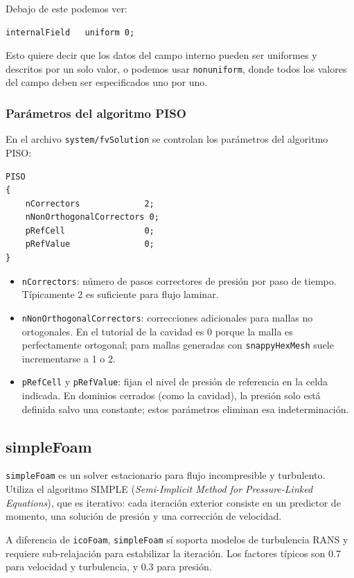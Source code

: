 Debajo de este podemos ver:
\begin{verbatim}
internalField   uniform 0;
\end{verbatim}
Esto quiere decir que los datos del campo interno pueden ser uniformes y descritos por un solo valor, o podemos usar \texttt{nonuniform}, donde todos los valores del campo deben ser especificados uno por uno.

\subsubsection*{Parámetros del algoritmo PISO}

En el archivo \texttt{system/fvSolution} se controlan los parámetros del algoritmo PISO:
\begin{verbatim}
PISO
{
    nCorrectors             2;
    nNonOrthogonalCorrectors 0;
    pRefCell                0;
    pRefValue               0;
}
\end{verbatim}
\begin{itemize}
  \item \texttt{nCorrectors}: número de pasos correctores de presión por paso de tiempo. Típicamente 2 es suficiente para flujo laminar.
  \item \texttt{nNonOrthogonalCorrectors}: correcciones adicionales para mallas no ortogonales. En el tutorial de la cavidad es 0 porque la malla es perfectamente ortogonal; para mallas generadas con \texttt{snappyHexMesh} suele incrementarse a 1 o 2.
  \item \texttt{pRefCell} y \texttt{pRefValue}: fijan el nivel de presión de referencia en la celda indicada. En dominios cerrados (como la cavidad), la presión solo está definida salvo una constante; estos parámetros eliminan esa indeterminación.
\end{itemize}

\subsection{simpleFoam}

\texttt{simpleFoam} es un solver estacionario para flujo incompresible y turbulento. Utiliza el algoritmo SIMPLE (\textit{Semi-Implicit Method for Pressure-Linked Equations}), que es iterativo: cada iteración exterior consiste en un predictor de momento, una solución de presión y una corrección de velocidad.

A diferencia de \texttt{icoFoam}, \texttt{simpleFoam} sí soporta modelos de turbulencia RANS y requiere sub-relajación para estabilizar la iteración. Los factores típicos son 0.7 para velocidad y turbulencia, y 0.3 para presión.

